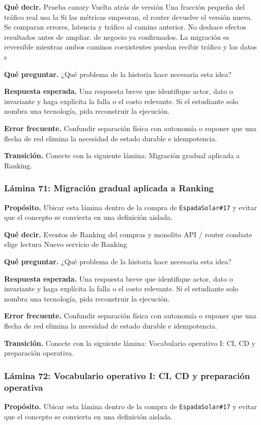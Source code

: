 \documentclass[variant=docente,cover=institutional,mode=screen]{ua-engineering-v6-article}
\begin{document}
\textbf{Qué decir.} Prueba canary Vuelta atrás de versión Una fracción pequeña del tráfico real usa la Si las métricas empeoran, el router devuelve el versión nueva. Se comparan errores, latencia y tráfico al camino anterior. No deshace efectos resultados antes de ampliar. de negocio ya confirmados. La migración es reversible mientras ambos caminos coexistentes puedan recibir tráfico y los datos s

\textbf{Qué preguntar.} ¿Qué problema de la historia hace necesaria esta idea?

\textbf{Respuesta esperada.} Una respuesta breve que identifique actor, dato o invariante y haga explícita la falla o el costo relevante. Si el estudiante solo nombra una tecnología, pida reconstruir la ejecución.

\textbf{Error frecuente.} Confundir separación física con autonomía o suponer que una flecha de red elimina la necesidad de estado durable e idempotencia.

\textbf{Transición.} Conecte con la siguiente lámina: Migración gradual aplicada a Ranking.

\subsubsection*{Lámina 71: Migración gradual aplicada a Ranking}
\textbf{Propósito.} Ubicar esta lámina dentro de la compra de \texttt{EspadaSolar\#17} y evitar que el concepto se convierta en una definición aislada.

\textbf{Qué decir.} Eventos de Ranking del compras y monolito API / router combate elige lectura Nuevo servicio de Ranking

\textbf{Qué preguntar.} ¿Qué problema de la historia hace necesaria esta idea?

\textbf{Respuesta esperada.} Una respuesta breve que identifique actor, dato o invariante y haga explícita la falla o el costo relevante. Si el estudiante solo nombra una tecnología, pida reconstruir la ejecución.

\textbf{Error frecuente.} Confundir separación física con autonomía o suponer que una flecha de red elimina la necesidad de estado durable e idempotencia.

\textbf{Transición.} Conecte con la siguiente lámina: Vocabulario operativo I: CI, CD y preparación operativa.

\subsubsection*{Lámina 72: Vocabulario operativo I: CI, CD y preparación operativa}
\textbf{Propósito.} Ubicar esta lámina dentro de la compra de \texttt{EspadaSolar\#17} y evitar que el concepto se convierta en una definición aislada.
\end{document}
